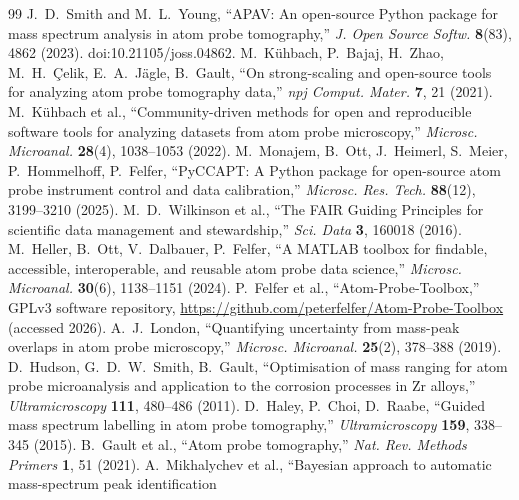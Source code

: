 \documentclass[11pt]{article}
\begin{document}
\begin{thebibliography}{99}
 J.~D.~Smith and M.~L.~Young,
``APAV: An open-source Python package for mass spectrum analysis in atom
probe tomography,'' \emph{J. Open Source Softw.} \textbf{8}(83), 4862
(2023). doi:10.21105/joss.04862.
 M.~Kühbach, P.~Bajaj,
H.~Zhao, M.~H.~Çelik, E.~A.~Jägle, B.~Gault, ``On strong-scaling and
open-source tools for analyzing atom probe tomography data,'' \emph{npj
Comput. Mater.} \textbf{7}, 21 (2021).
 M.~Kühbach et al.,
``Community-driven methods for open and reproducible software tools for
analyzing datasets from atom probe microscopy,'' \emph{Microsc.
Microanal.} \textbf{28}(4), 1038--1053 (2022).
 M.~Monajem, B.~Ott,
J.~Heimerl, S.~Meier, P.~Hommelhoff, P.~Felfer, ``PyCCAPT: A Python
package for open-source atom probe instrument control and data
calibration,'' \emph{Microsc. Res. Tech.} \textbf{88}(12), 3199--3210
(2025).
 M.~D.~Wilkinson et al.,
``The FAIR Guiding Principles for scientific data management and
stewardship,'' \emph{Sci. Data} \textbf{3}, 160018 (2016).
 M.~Heller, B.~Ott,
V.~Dalbauer, P.~Felfer, ``A MATLAB toolbox for findable, accessible,
interoperable, and reusable atom probe data science,'' \emph{Microsc.
Microanal.} \textbf{30}(6), 1138--1151 (2024).
 P.~Felfer et al.,
``Atom-Probe-Toolbox,'' GPLv3 software repository,
\url{https://github.com/peterfelfer/Atom-Probe-Toolbox} (accessed 2026).
 A.~J.~London, ``Quantifying
uncertainty from mass-peak overlaps in atom probe microscopy,''
\emph{Microsc. Microanal.} \textbf{25}(2), 378--388 (2019).
 D.~Hudson, G.~D.~W.~Smith,
B.~Gault, ``Optimisation of mass ranging for atom probe microanalysis and
application to the corrosion processes in Zr alloys,''
\emph{Ultramicroscopy} \textbf{111}, 480--486 (2011).
 D.~Haley, P.~Choi,
D.~Raabe, ``Guided mass spectrum labelling in atom probe tomography,''
\emph{Ultramicroscopy} \textbf{159}, 338--345 (2015).
 B.~Gault et al., ``Atom
probe tomography,'' \emph{Nat. Rev. Methods Primers} \textbf{1}, 51
(2021).
 A.~Mikhalychev et
al., ``Bayesian approach to automatic mass-spectrum peak identification

\end{thebibliography}
\end{document}
